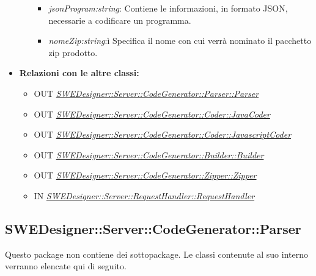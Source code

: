 \documentclass[../DefinizioneDiProdotto.tex]{subfiles}
\begin{document}
\begin{itemize}
\begin{itemize}
					\begin{itemize}
						\item \emph{jsonProgram:string}: Contiene le informazioni, in formato JSON, necessarie a codificare un programma.\\
						\item \emph{nomeZip:string}:ì Specifica il nome con cui verrà nominato il pacchetto zip prodotto.\\
					\end{itemize}
				\end{itemize}				
				\item \textbf{Relazioni con le altre classi:}
				\begin{itemize}
					\item OUT \hyperlink{SWEDesigner::Server::CodeGenerator::Parser::Parser}{\emph{SWEDesigner::Server::CodeGenerator::Parser::Parser}}\\
					\item OUT \hyperlink{SWEDesigner::Server::CodeGenerator::Coder::JavaCoder}{\emph{SWEDesigner::Server::CodeGenerator::Coder::JavaCoder}}\\
					\item OUT \hyperlink{SWEDesigner::Server::CodeGenerator::Coder::JavascriptCoder}{\emph{SWEDesigner::Server::CodeGenerator::Coder::JavascriptCoder}}\\
					\item OUT \hyperlink{SWEDesigner::Server::CodeGenerator::Builder::Builder}{\emph{SWEDesigner::Server::CodeGenerator::Builder::Builder}}\\
					\item OUT \hyperlink{SWEDesigner::Server::CodeGenerator::Zipper::Zipper}{\emph{SWEDesigner::Server::CodeGenerator::Zipper::Zipper}}\\
					\item IN \hyperlink{SWEDesigner::Server::RequestHandler::RequestHandler}{\emph{SWEDesigner::Server::RequestHandler::RequestHandler}}\\
				\end{itemize}	
			\end{itemize}
			
				
			
			
			
			\subsection{SWEDesigner::Server::CodeGenerator::Parser}
			Questo package non contiene dei sottopackage.
			Le classi contenute al suo interno verranno elencate qui di seguito.
			
\end{document}

